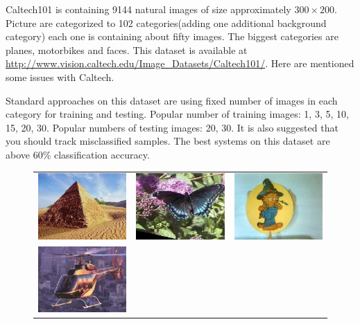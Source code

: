 Caltech101 is containing 9144 natural images of size approximately \(300\times200\). Picture are categorized to 102 categories(adding one additional background category) each one is containing about fifty images. The biggest categories are planes, motorbikes and faces. This dataset is available at \url{http://www.vision.caltech.edu/Image_Datasets/Caltech101/}. Here are mentioned some issues with Caltech. 

Standard approaches on this dataset are using fixed number of images in each category for training and testing. Popular number of training images: 1, 3, 5, 10, 15, 20, 30. Popular numbers of testing images: 20, 30. It is also suggested that you should track misclassified samples. The best systems on this dataset are above 60\% classification accuracy. 

\begin{figure}[h]
\centering
{\renewcommand{\arraystretch}{0}
\setlength{\tabcolsep}{0cm}
\begin{tabular}{c c c}
\includegraphics[scale=0.2]{./pictures/caltech_1.jpg} & 
\includegraphics[scale=0.2]{./pictures/caltech_2.jpg} &
\includegraphics[scale=0.2]{./pictures/caltech_3.jpg} \\
\includegraphics[scale=0.2]{./pictures/caltech_4.jpg} &

\end{tabular}}
\end{figure}

